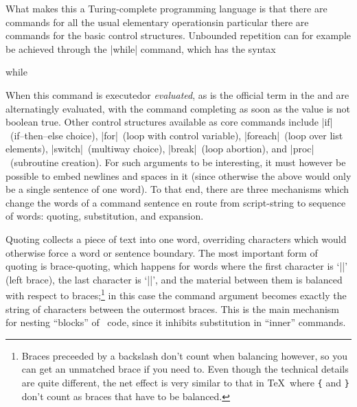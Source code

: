\documentclass{mtmtcl}
\newcommand{\cs}[1]{\texttt{\PrintChar{92}#1}}
\theoremstyle{plain}
\theoremstyle{remark}
\begin{document}
What makes this a Turing-complete programming language is that there 
are commands for all the usual elementary operations\Dash in 
particular there are commands for the basic control structures. 
Unbounded repetition can for example be achieved through the |while| 
command, which has the syntax
\begin{displaysyntax}
  while  
\end{displaysyntax}
When this command is executed\Ldash or \emph{evaluated}, as is the 
official term in \Tcl\Rdash the  and  
are alternatingly evaluated, with the command completing as soon as 
the  value is not boolean true. Other control 
structures available as core commands include |if|~(if--then--else 
choice), |for|~(loop with control variable), |foreach|~(loop over 
list elements), |switch|~(multiway choice), |break|~(loop abortion), 
and |proc|~(subroutine creation).
For such  arguments to be interesting, it must however 
be possible to embed newlines and spaces in it (since otherwise the 
 above would only be a single sentence of one word). 
To that end, there are three mechanisms which change the words of a 
command sentence en route from script-string to sequence of words: 
quoting, substitution, and expansion.

Quoting collects a piece of text into one word, overriding characters 
which would otherwise force a word or sentence boundary. The most 
important form of quoting is brace-quoting, which happens for words 
where the first character is `|{|' (left brace), the last character 
is `|}|', and the material between them is balanced with respect to 
braces;\footnote{
  Braces preceeded by a backslash don't count when balancing however, 
  so you can get an unmatched brace if you need to. Even though the 
  technical details are quite different, the net effect is 
  very similar to that in \TeX\ where \cs{\{} and \cs{\}} don't 
  count as braces that have to be balanced.
} in this case the command argument becomes exactly the string 
of characters between the outermost braces. This is the main 
mechanism for nesting ``blocks'' of \Tcl\ code, since it inhibits 
substitution in ``inner'' commands.
\end{document}
